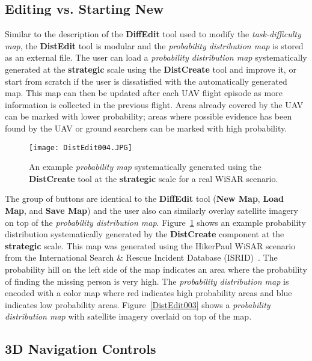 \subsection{Editing vs. Starting New}

Similar to the description of the \textbf{DiffEdit} tool used to modify the \textit{task-difficulty map}, the \textbf{DistEdit} tool is modular and the \textit{probability distribution map} is stored as an external file. The user can load a \textit{probability distribution map} systematically generated at the \textbf{strategic} scale using the \textbf{DistCreate} tool and improve it, or start from scratch if the user is dissatisfied with the automatically generated map. This map can then be updated after each UAV flight episode as more information is collected in the previous flight. Areas already covered by the UAV can be marked with lower probability; areas where possible evidence has been found by the UAV or ground searchers can be marked with high probability. 

\begin{figure}[!ht]
\centering
\texttt{[image: DistEdit004.JPG]}
\caption{An example \textit{probability map} systematically generated using the \textbf{DistCreate} tool at the \textbf{strategic} scale for a real WiSAR scenario.}
\label{DistEdit004}
\end{figure}

The group of buttons are identical to the \textbf{DiffEdit} tool (\textbf{New Map}, \textbf{Load Map}, and \textbf{Save Map}) and the user also can similarly overlay satellite imagery on top of the \textit{probability distribution map}. Figure~\ref{DistEdit004} shows an example probability distribution systematically generated by the \textbf{DistCreate} component at the \textbf{strategic} scale. This map was generated using the HikerPaul WiSAR scenario~\cite{Lin2014Hierarchical} from the International Search \& Rescue Incident Database (ISRID)~\cite{Koester2008Lost}. The probability hill on the left side of the map indicates an area where the probability of finding the missing person is very high. The \textit{probability distribution map} is encoded with a color map where red indicates high probability areas and blue indicates low probability areas. Figure~\ref{DistEdit003} shows a \textit{probability distribution map} with satellite imagery overlaid on top of the map.

\subsection{3D Navigation Controls}

